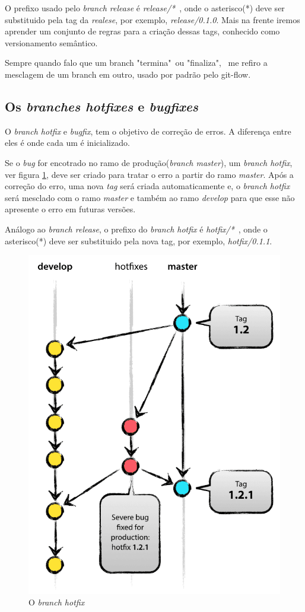 \documentclass[12pt,openright,oneside,a4paper,english,brazil]{abntex2}
\begin{document}
O prefixo usado pelo \textit{branch release} é \textit{release/*}\ , onde o asterisco(*) deve ser substituido pela tag da \textit{realese}, por exemplo, \textit{release/0.1.0}. Mais na frente iremos aprender um conjunto de regras para a criação dessas tags, conhecido como versionamento semântico.

Sempre quando falo que um branch "termina"\ ou "finaliza", \ me refiro a mesclagem de um branch em outro, usado por padrão pelo git-flow.

\subsection{Os \textit{branches hotfixes} e \textit{bugfixes}}

O \textit{branch hotfix} e \textit{bugfix}, tem o objetivo de correção de erros. A diferença entre eles é onde cada um é inicializado. 

Se o \textit{bug} for encotrado no ramo de produção(\textit{branch master}), um \textit{branch hotfix}, ver figura \ref{hotfix}, deve ser criado para tratar o erro a partir do ramo \textit{master}. Após a correção do erro, uma nova \textit{tag} será criada automaticamente e, o \textit{branch hotfix} será mesclado com o ramo \textit{master} e também ao ramo \textit{develop} para que esse não apresente o erro em futuras versões.

Análogo ao \textit{branch release}, o prefixo do \textit{branch hotfix} é \textit{hotfix/*}\ , onde o asterisco(*) deve ser substituido pela nova tag, por exemplo, \textit{hotfix/0.1.1}.

\begin{figure}[h]
	\caption{\label{hotfix}O \textit{branch hotfix}}
	\begin{center}
		\includegraphics[width=0.6\linewidth]{hotfix}
	\end{center}
\end{figure}
\end{document}

